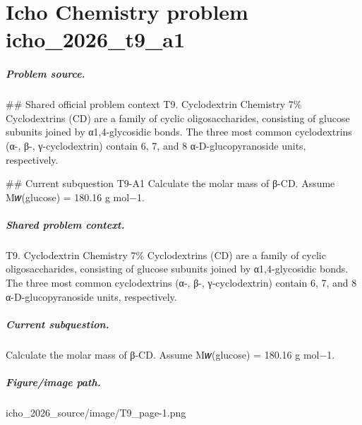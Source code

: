 
\chapter{Icho Chemistry problem icho\_2026\_t9\_a1}
\label{ch:IChO2026Problems_problem_icho_2026_t9_a1}

\paragraph{Problem source.}
\#\# Shared official problem context
T9. Cyclodextrin Chemistry 7\% Cyclodextrins (CD) are a family of cyclic oligosaccharides, consisting of glucose subunits joined by α1,4-glycosidic bonds. The three most common cyclodextrins (α-, β-, γ-cyclodextrin) contain 6, 7, and 8 α-D-glucopyranoside units, respectively.

\#\# Current subquestion T9-A1
Calculate the molar mass of β-CD. Assume M𝑤(glucose) = 180.16 g mol−1.

\paragraph{Shared problem context.}
T9. Cyclodextrin Chemistry 7\% Cyclodextrins (CD) are a family of cyclic oligosaccharides, consisting of glucose subunits joined by α1,4-glycosidic bonds. The three most common cyclodextrins (α-, β-, γ-cyclodextrin) contain 6, 7, and 8 α-D-glucopyranoside units, respectively.

\paragraph{Current subquestion.}
Calculate the molar mass of β-CD. Assume M𝑤(glucose) = 180.16 g mol−1.

\paragraph{Figure/image path.}
icho\_2026\_source/image/T9\_page-1.png

